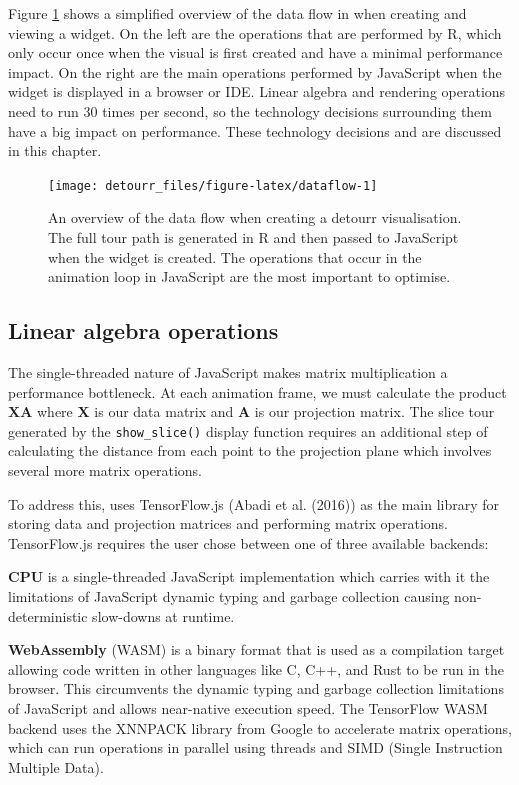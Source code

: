 Figure \ref{fig:dataflow} shows a simplified overview of the data flow in  when creating and viewing a widget. On the left are the operations that are performed by R, which only occur once when the visual is first created and have a minimal performance impact. On the right are the main operations performed by JavaScript when the widget is displayed in a browser or IDE. Linear algebra and rendering operations need to run 30 times per second, so the technology decisions surrounding them have a big impact on performance. These technology decisions and are discussed in this chapter.

\begin{figure}
\texttt{[image: detourr\_files/figure-latex/dataflow-1]} \caption{An overview of the data flow when creating a detourr visualisation. The full tour path is generated in R and then passed to JavaScript when the widget is created. The operations that occur in the animation loop in JavaScript are the most important to optimise.}\label{fig:dataflow}
\end{figure}

\hypertarget{linear-algebra-operations}{%
\subsection{Linear algebra operations}\label{linear-algebra-operations}}

The single-threaded nature of JavaScript makes matrix multiplication a performance bottleneck. At each animation frame, we must calculate the product \(\mathbf{XA}\) where \(\mathbf{X}\) is our data matrix and \(\mathbf{A}\) is our projection matrix. The slice tour generated by the \texttt{show\_slice()} display function requires an additional step of calculating the distance from each point to the projection plane which involves several more matrix operations.

To address this,  uses TensorFlow.js (Abadi et al. (2016)) as the main library for storing data and projection matrices and performing matrix operations. TensorFlow.js requires the user chose between one of three available backends:

\textbf{CPU} is a single-threaded JavaScript implementation which carries with it the limitations of JavaScript dynamic typing and garbage collection causing non-deterministic slow-downs at runtime.

\textbf{WebAssembly} (WASM) is a binary format that is used as a compilation target allowing code written in other languages like C, C++, and Rust to be run in the browser. This circumvents the dynamic typing and garbage collection limitations of JavaScript and allows near-native execution speed. The TensorFlow WASM backend uses the XNNPACK library from Google to accelerate matrix operations, which can run operations in parallel using threads and SIMD (Single Instruction Multiple Data).

